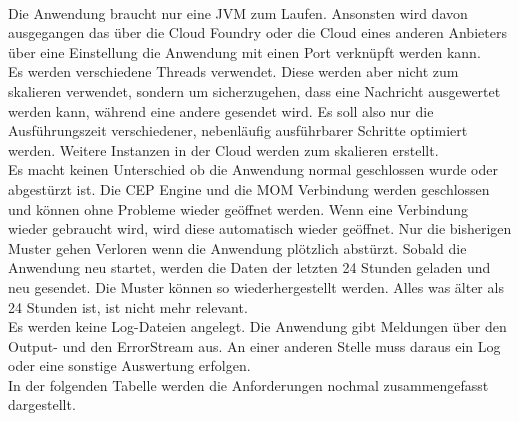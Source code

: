 \\
Die Anwendung braucht nur eine JVM zum Laufen. Ansonsten wird davon ausgegangen das über die Cloud Foundry oder die Cloud eines anderen Anbieters über eine Einstellung die Anwendung mit einen Port verknüpft werden kann. 
\\
Es werden verschiedene Threads verwendet. Diese werden aber nicht zum skalieren verwendet, sondern um sicherzugehen, dass eine Nachricht ausgewertet werden kann, während eine andere gesendet wird. Es soll also nur die Ausführungszeit verschiedener, nebenläufig ausführbarer Schritte optimiert werden. Weitere Instanzen in der Cloud werden zum skalieren erstellt. 
\\
Es macht keinen Unterschied ob die Anwendung normal geschlossen wurde oder abgestürzt ist. Die CEP Engine und die MOM Verbindung werden geschlossen und können ohne Probleme wieder geöffnet werden. Wenn eine Verbindung wieder gebraucht wird, wird diese automatisch wieder geöffnet. Nur die bisherigen Muster gehen Verloren wenn die Anwendung plötzlich abstürzt. Sobald die Anwendung neu startet, werden die Daten der letzten 24 Stunden geladen und neu gesendet. Die Muster können so wiederhergestellt werden. Alles was älter als 24 Stunden ist, ist nicht mehr relevant. 
\\
Es werden keine Log-Dateien angelegt. Die Anwendung gibt Meldungen über den Output- und den ErrorStream aus. An einer anderen Stelle muss daraus ein Log oder eine sonstige Auswertung erfolgen. 
\\
In der folgenden Tabelle werden die Anforderungen nochmal zusammengefasst dargestellt. 

